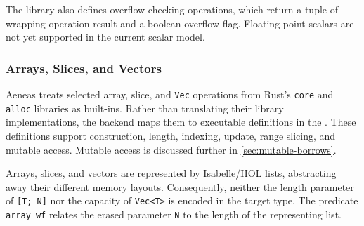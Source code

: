 The \rprelude{} library also defines overflow-checking operations, which return a tuple of wrapping operation result and a boolean overflow flag.
Floating-point scalars are not yet supported in the current scalar model.


\subsubsection{Arrays, Slices, and Vectors}

Aeneas treats selected array, slice, and \texttt{Vec} operations from Rust's \texttt{core} and \texttt{alloc} libraries as built-ins. Rather than translating their library implementations, the backend maps them to executable definitions in the \rprelude{}.
These definitions support construction, length, indexing, update, range slicing, and mutable access.  Mutable access is discussed further in \autoref{sec:mutable-borrows}.

Arrays, slices, and vectors are represented by Isabelle/HOL lists, abstracting away their different memory layouts.
Consequently, neither the length parameter of \texttt{[T; N]} nor the capacity of \texttt{Vec<T>} is encoded in the target type.
The predicate \texttt{array\_wf} relates the erased parameter \texttt{N} to the length of the representing list.

